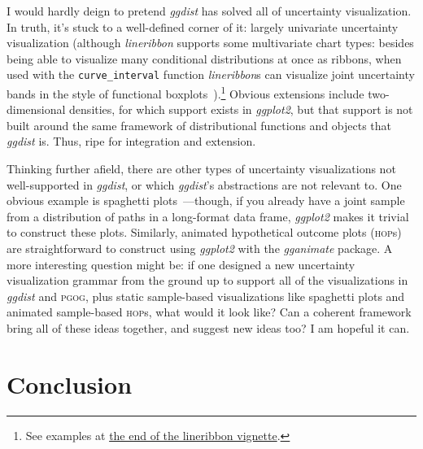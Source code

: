 \documentclass[journal]{vgtc}                     %
\begin{document}
I would hardly deign to pretend \textit{ggdist} has solved all of uncertainty visualization. In truth, it's stuck to a well-defined corner of it: largely univariate uncertainty visualization (although \textit{lineribbon} supports some multivariate chart types: besides being able to visualize many conditional distributions at once as ribbons, when used with the \texttt{curve\_interval} function \textit{lineribbon}s can visualize joint uncertainty bands in the style of functional boxplots~\cite{sun2011functional,mirzargar2014curve,juul2021fixed}).\footnote{See examples at \href{https://mjskay.github.io/ggdist/articles/lineribbon.html\#curve-boxplots-aka-lineribbons-with-joint-intervals-or-curvewise-intervals}{the end of the lineribbon vignette}.} Obvious extensions include two-dimensional densities, for which support exists in \textit{ggplot2}, but that support is not built around the same framework of distributional functions and objects that \textit{ggdist} is. Thus, ripe for integration and extension.

Thinking further afield, there are other types of uncertainty visualizations not well-supported in \textit{ggdist}, or which \textit{ggdist}'s abstractions are not relevant to. One obvious example is spaghetti plots~\cite{cox2013visualizing,liu2018visualizing}---though, if you already have a joint sample from a distribution of paths in a long-format data frame, \textit{ggplot2} makes it trivial to construct these plots. Similarly, animated hypothetical outcome plots (\textsc{hop}s)~\cite{hullman2015hypothetical,kale2018hypothetical} are straightforward to construct using \textit{ggplot2} with the \textit{gganimate} package. A more interesting question might be: if one designed a new uncertainty visualization grammar from the ground up to support all of the  visualizations in \textit{ggdist} and \textsc{pgog}, plus static sample-based visualizations like spaghetti plots and animated sample-based \textsc{hop}s, what would it look like? Can a coherent framework bring all of these ideas together, and suggest new ideas too? I am hopeful it can.

\section{Conclusion}
\end{document}
